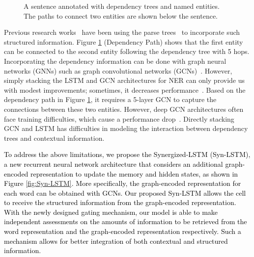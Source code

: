 \documentclass[11pt]{article}
\begin{document}
\begin{figure}[t!]
{ 
	}
\caption{A sentence annotated with dependency trees and named entities. The paths to connect two entities are shown below the sentence.}
	\label{fig:intro}
\end{figure}
Previous research works~\cite{li2017leveraging,Jie2019DependencyGuidedLF,wang2019chinese} have been using the parse trees~\cite{chomsky,chomsky1969aspects,sandra2014morphological} to incorporate such structured information.
Figure \ref{fig:intro} (Dependency Path) 
shows that the first entity can be connected to the second entity following the dependency tree with 5 hops. 
Incorporating the dependency information can be done with graph neural networks (GNNs) such as graph convolutional networks (GCNs)~\cite{kipf2017semi}.
However, simply stacking the LSTM and GCN architectures for NER can only provide us with modest improvements; sometimes, it decreases performance~\cite{Jie2019DependencyGuidedLF}.
Based on the dependency path in Figure \ref{fig:intro}, it requires a 5-layer 
GCN to capture the connections between these two entities.
However, deep GCN architectures often face training difficulties, which cause a performance drop~\cite{Hamilton2017InductiveRL,kipf2017semi}.
Directly stacking GCN and LSTM has difficulties in modeling the interaction between dependency trees and contextual information.







\textcolor{black}{
To address the above limitations, we propose the Synergized-LSTM (Syn-LSTM), a new recurrent neural network architecture that considers an additional graph-encoded representation to update the memory and hidden states, as shown in Figure \ref{fig:Syn-LSTM}.
More specifically, the graph-encoded representation for each word can be obtained with GCNs. 
Our proposed Syn-LSTM allows the cell to receive the structured information from the graph-encoded representation. 
With the newly designed gating mechanism, our model is able to make independent assessments on the amounts of information to be retrieved from the word representation and the graph-encoded representation respectively. 
Such a mechanism allows for better integration of both contextual  and structured information.}
\end{document}
